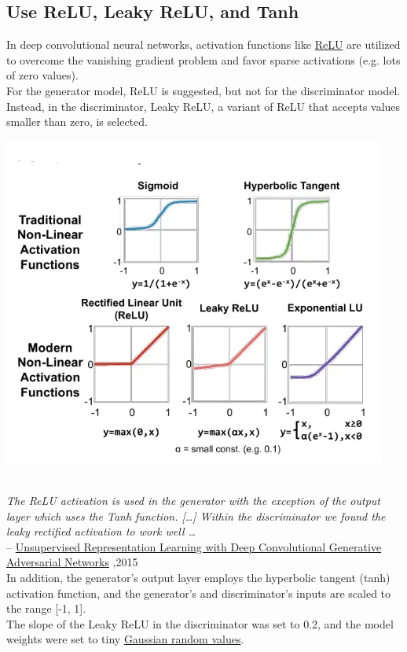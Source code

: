 \documentclass[14pt]{article}
\begin{document}
\subsection{Use ReLU, Leaky ReLU, and Tanh}
In deep convolutional neural networks, activation functions like \hyperlink{https://machinelearningmastery.com/how-to-fix-vanishing-gradients-using-the-rectified-linear-activation-function/}{ReLU} are utilized to overcome the vanishing gradient problem and favor sparse activations (e.g. lots of zero values).\\
For the generator model, ReLU is suggested, but not for the discriminator model. Instead, in the discriminator, Leaky ReLU, a variant of ReLU that accepts values smaller than zero, is selected.
\\ 
\begin{center}
    \includegraphics[width = 7 cm ]{relu.png}
    \\ \\ 
\end{center} 
\hspace*{1cm} \textit{The ReLU activation is used in the generator with the exception of the output layer which uses the Tanh function. […] Within the discriminator we found the leaky rectified activation to work well …}
\\
\hspace*{4cm} --
\hyperlink{https://arxiv.org/abs/1511.06434}{Unsupervised Representation Learning with Deep Convolutional Generative Adversarial Networks} ,2015
\\
In addition, the generator's output layer employs the hyperbolic tangent (tanh) activation function, and the generator's and discriminator's inputs are scaled to the range [-1, 1].\\
The slope of the Leaky ReLU in the discriminator was set to 0.2, and the model weights were set to tiny \hyperlink{https://machinelearningmastery.com/how-to-generate-random-numbers-in-python/}{Gaussian random values}.\\
\end{document}
